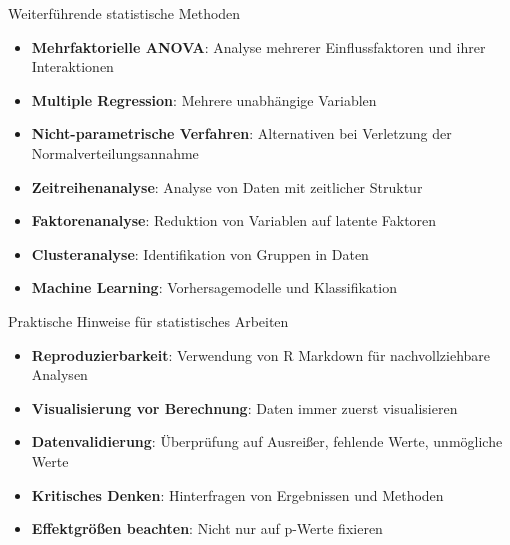 \documentclass[
  ignorenonframetext,
]{beamer}
\providecommand{\tightlist}{%
  \setlength{\itemsep}{0pt}\setlength{\parskip}{0pt}}
\begin{document}
\begin{frame}{Weiterführende statistische Methoden}
\protect{}\label{weiterfuxfchrende-statistische-methoden}
\begin{itemize}
\tightlist
\item
  \textbf{Mehrfaktorielle ANOVA}: Analyse mehrerer Einflussfaktoren und
  ihrer Interaktionen
\item
  \textbf{Multiple Regression}: Mehrere unabhängige Variablen
\item
  \textbf{Nicht-parametrische Verfahren}: Alternativen bei Verletzung
  der Normalverteilungsannahme
\item
  \textbf{Zeitreihenanalyse}: Analyse von Daten mit zeitlicher Struktur
\item
  \textbf{Faktorenanalyse}: Reduktion von Variablen auf latente Faktoren
\item
  \textbf{Clusteranalyse}: Identifikation von Gruppen in Daten
\item
  \textbf{Machine Learning}: Vorhersagemodelle und Klassifikation
\end{itemize}
\end{frame}

\begin{frame}{Praktische Hinweise für statistisches Arbeiten}
\protect{}\label{praktische-hinweise-fuxfcr-statistisches-arbeiten}
\begin{itemize}
\tightlist
\item
  \textbf{Reproduzierbarkeit}: Verwendung von R Markdown für
  nachvollziehbare Analysen
\item
  \textbf{Visualisierung vor Berechnung}: Daten immer zuerst
  visualisieren
\item
  \textbf{Datenvalidierung}: Überprüfung auf Ausreißer, fehlende Werte,
  unmögliche Werte
\item
  \textbf{Kritisches Denken}: Hinterfragen von Ergebnissen und Methoden
\item
  \textbf{Effektgrößen beachten}: Nicht nur auf p-Werte fixieren
\end{itemize}
\end{frame}
\end{document}
